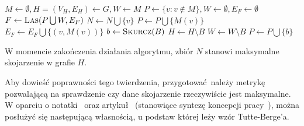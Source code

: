 {\begin{algorithm}
\begin{algorithmic}[1]
        \State $M \gets \emptyset, H=(V_H, E_H) \gets G, W \gets M$
        \State $P \gets \{v: v \notin M\}, W \gets \emptyset, E_F \gets \emptyset$\label{init_edmonds}
        \State $F \gets \Call{Las}{P \bigcup W, E_F}$
        \label{pick_edge}
        \EndIf
        \label{put_matched_in_odd}
          \State $N \gets N \bigcup \{v\}$
          \State $P \gets P \bigcup \{M(v)\}$
          \State $E_F \gets E_F \bigcup \{(v, M(v))\}$
        \label{even_connected}
          \State $b \gets \Call{Skurcz}{B}$
          \State $H \gets H\setminus B$
          \State $W \gets W\setminus B$
          \State $P \gets P \bigcup \{b\}$
        \label{even_disjoint}
          \State{}
        \EndIf
      \EndFunction
    \end{algorithmic}
  \end{algorithm}
  \begin{theorem}
    W momencie zakończenia działania algorytmu, zbiór $N$ stanowi maksymalne skojarzenie w grafie $H$.
  \end{theorem}
  Aby dowieść poprawności tego twierdzenia, przygotować należy metrykę pozwalającą na sprawdzenie czy dane skojarzenie rzeczywiście jest maksymalne.
  W oparciu o notatki~\cite{Tutte-Berge:notes} oraz artykuł~\cite{cohen:hal-00358468} (stanowiące syntezę koncepcji pracy~\cite{Tutte-Berge:original}),  można posłużyć się następującą własnością, u podstaw której leży wzór Tutte-Berge'a.

}
